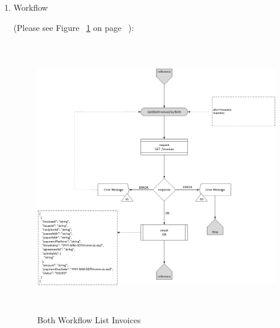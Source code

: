 \begin{enumerate}
\begin{table}[H]
\begin{center}
\begin{tabular}{|p{3cm}|l|p{3cm}|p{3cm}|p{4cm}|}
\end{tabular}
\end{center}
\end{table}

\item Workflow

(Please see Figure ~\ref{fig:BLI} on page ~\pageref{fig:BLI}):

\begin{figure}[htbp]
    \centering
    \includegraphics[width=12cm,height=12cm,angle=0]{./diag/Workflow/Payment/List(GetInvoices)-B-Workflow.png}
    \caption{Both Workflow List Invoices }
	\label{fig:BLI}
\end{figure}


\end{enumerate}

\newpage



